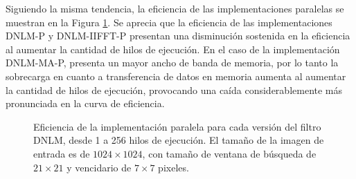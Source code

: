   Siguiendo la misma tendencia, la eficiencia de las implementaciones paralelas se muestran en la Figura \ref{fig:efficiency}. Se aprecia que la eficiencia de las implementaciones DNLM-P y DNLM-IIFFT-P presentan una disminución sostenida en la eficiencia al aumentar la cantidad de hilos de ejecución. En el caso de la implementación DNLM-MA-P, presenta un mayor ancho de banda de memoria, por lo tanto la sobrecarga en cuanto a transferencia de datos en memoria aumenta al aumentar la cantidad de hilos de ejecución, provocando una caída considerablemente más pronunciada en la curva de eficiencia.
  
  \begin{figure}[htb]
  \centering
  \caption[Eficiencia de las implementaciones paralelas del filtro DNLM.]{Eficiencia de la implementación paralela para cada versión del filtro DNLM, desde 1 a 256 hilos de ejecución. El tama\~no de la imagen de entrada es de $1024\times1024$, con tama\~no de ventana de búsqueda de $21 \times 21$ y vencidario de $7 \times 7$ pixeles. \label{fig:efficiency}}
  \end{figure}
  
  
  